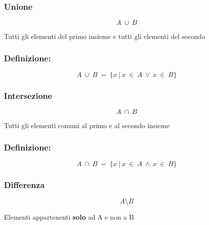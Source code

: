     \subsubsection{Unione}
        \begin{Large}
            \begin{equation*}
                A\ \cup\ B
            \end{equation*}
        \end{Large}
        Tutti gli elementi del primo insieme e tutti gli elementi del secondo\newline
        
        \subsubsection*{Definizione:}
        
        \begin{Large}
            \begin{equation*}
                A\ \cup\ B\ =\ \{x\ |\ x\ \in\ A\ \vee\ x\ \in\ B\}
            \end{equation*}
        \end{Large}

        \subsubsection{Intersezione}
        \begin{Large}
            \begin{equation*}
                A\ \cap\ B
            \end{equation*}
        \end{Large}
        Tutti gli elementi comuni al primo e al secondo insieme\newline
        
        \subsubsection*{Definizione:}
        
        \begin{Large}
            \begin{equation*}
                A\ \cap\ B\ =\ \{x\ |\ x\ \in\ A\ \land\ x\ \in\ B\}
            \end{equation*}
        \end{Large}

        \subsubsection{Differenza}
        \begin{Large}
            \begin{equation*}
                A \setminus B
            \end{equation*}
        \end{Large}
        Elementi appartenenti \textbf{solo} ad A e non a B\newline
        
